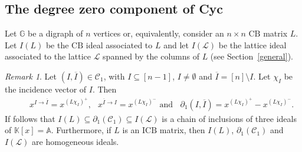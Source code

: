 \documentclass[10pt]{amsart}
\newcommand{\mbk}{\mbox{$\mathbb{K}$}}
\newcommand{\mba}{\mbox{$\mathbb{A}$}}
\newcommand{\mbg}{\mbox{$\mathbb{G}$}}
\newcommand{\mcc}{\mbox{$\mathcal{C}$}}
\newcommand{\mcl}{\mbox{$\mathcal{L}$}}
\newcommand{\icb}{\mbox{$\mathrm{ICB}$}}
\newcommand{\cb}{\mbox{$\mathrm{CB}$}}
\newcommand{\dif}{\mbox{$\partial$}}
\theoremstyle{definition}
\theoremstyle{remark}
\newtheorem{remark}[cdrthm]{Remark}
\begin{document}
\subsection{The degree zero component of Cyc}

 Let $\mbg$ be a digraph of $n$ vertices or, equivalently,
consider an $n\times n$ $\cb$ matrix $L$. Let $I(L)$ be the $\cb$
ideal associated to $L$ and let $I(\mcl)$ be the lattice ideal
associated to the lattice $\mcl$ spanned by the columns of $L$ (see
Section~\ref{general}).

\begin{remark}\label{Iind1C}
Let $(I,\overline{I})\in \mcc_1$, with $I\subseteq [n-1]$,
$I\neq\emptyset$ and $\overline{I}=[n]\setminus I$. Let $\chi_I$ be
the incidence vector of $I$. Then
\begin{eqnarray}\label{d1(I,J)}
\phantom{++} x^{I\to\overline{I}}=x^{(L\chi_I)^+}\mbox{, }\;\; x^{\overline{I}\to
  I}=x^{(L\chi_I)^-}\mbox{ and }\;\;\dif_1(I,\overline{I})=
x^{(L\chi_I)^+}-x^{(L\chi_I)^-}.
\end{eqnarray}
If follows that $I(L)\subseteq \dif_1(\mcc_1)\subseteq I(\mcl)$ is a
chain of inclusions of three ideals of $\mbk[x]=\mba$. Furthermore, if
$L$ is an $\icb$ matrix, then $I(L)$, $\dif_1(\mcc_1)$ and $I(\mcl)$ are
homogeneous ideals.
\end{remark}
\end{document}
